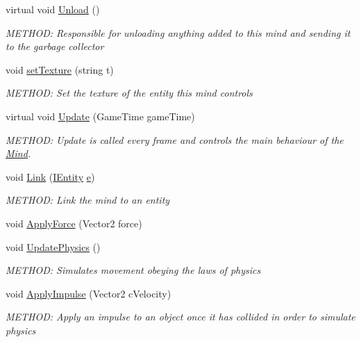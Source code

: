\begin{DoxyCompactItemize}
virtual void \hyperlink{a00318_a15bf25a4a74706ef37592689f43c0598}{Unload} ()
\begin{DoxyCompactList}\small\item\em M\+E\+T\+H\+OD\+: Responsible for unloading anything added to this mind and sending it to the garbage collector \end{DoxyCompactList}\item 
void \hyperlink{a00318_a08db67e6cb8d5ff8015afa4fb780c5e8}{set\+Texture} (string t)
\begin{DoxyCompactList}\small\item\em M\+E\+T\+H\+OD\+: Set the texture of the entity this mind controls \end{DoxyCompactList}\item 
virtual void \hyperlink{a00318_adec6999d87accf7371de1536eac2541b}{Update} (Game\+Time game\+Time)
\begin{DoxyCompactList}\small\item\em M\+E\+T\+H\+OD\+: Update is called every frame and controls the main behaviour of the \hyperlink{a00318}{Mind}. \end{DoxyCompactList}\item 
void \hyperlink{a00318_a3f2db3b7d2b8b68a02b56472467ffd12}{Link} (\hyperlink{a00438}{I\+Entity} \hyperlink{a00318_ad89c9691d6b32053fe8ffcdeb68bdacf}{e})
\begin{DoxyCompactList}\small\item\em M\+E\+T\+H\+OD\+: Link the mind to an entity \end{DoxyCompactList}\item 
void \hyperlink{a00318_a4a05ceb8a5b1eb7f04e3111dd165b4b5}{Apply\+Force} (Vector2 force)
\item 
void \hyperlink{a00318_afc6609503e3a531416f5080b2114e24a}{Update\+Physics} ()
\begin{DoxyCompactList}\small\item\em M\+E\+T\+H\+OD\+: Simulates movement obeying the laws of physics \end{DoxyCompactList}\item 
void \hyperlink{a00318_a378218df0a8c27a981e98167197d9c16}{Apply\+Impulse} (Vector2 c\+Velocity)
\begin{DoxyCompactList}\small\item\em M\+E\+T\+H\+OD\+: Apply an impulse to an object once it has collided in order to simulate physics \end{DoxyCompactList}\end{DoxyCompactItemize}
